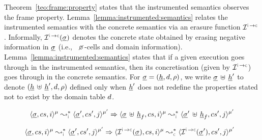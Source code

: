 


Theorem~\ref{teo:frame:property} states that the \jsil instrumented semantics observes the 
frame property. Lemma~\ref{lemma:instrumented:semantics} relates the instrumented 
semantics with the concrete semantics via an erasure function  $\interpret{\instconc}{}$. Informally, $\interpret{\instconc}{}(\istate)$
denotes the concrete state obtained by erasing negative information in $\underline{\sigma}$ (i.e.,~  
$\none$-cells and domain information). 
Lemma~\ref{lemma:instrumented:semantics} states that if a given execution 
goes through in the instrumented semantics, then its concretisation (given by $\interpret{\instconc}{}$) 
goes through in the concrete semantics. %
For $\underline{\sigma} = (\underline{h}, d, \rho)$, we write $\underline{\sigma} \, \uplus \, \underline{h}'$ to denote $(\underline{h} \, \uplus \, \underline{h}', d, \rho)$ defined only when $\underline{h}'$ does not redefine the properties stated not to exist by the domain table $d$.

\begin{theorem}\label{teo:frame:property}
\hspace*{-0.28cm}$$
\transabssemrule{\istate, \cs, i}{\istate', \cs', j}{\mode}{\mode'}{\instrumented}\Rightarrow
        \transabssemrule{\istate \dunion \iheap_f, \cs, i}{\istate' \dunion \iheap_f, \cs', j}{\mode}{\mode'}{\instrumented} 
$$
\end{theorem}

\begin{lemma}\label{lemma:instrumented:semantics}
$$
\hspace*{-0.22cm}
\transabssemrule{\istate, \cs, i}{\istate', \cs', j}{\mode}{\mode'}{\instrumented} \Rightarrow \transabssemrule{\interpret{\instconc}{}(\istate), \cs, i}{\interpret{\instconc}{}(\istate'), \cs', j}{\mode}{\mode'}{\concrete} 
$$
\end{lemma}



